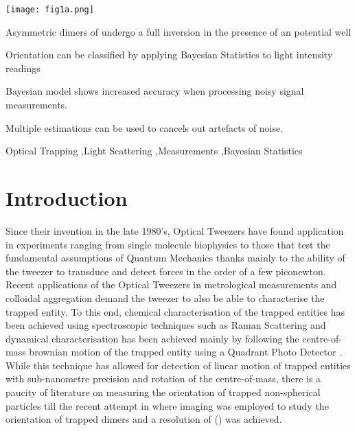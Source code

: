 \documentclass[final,3p, twocolumn]{elsarticle}
\begin{document}
\begin{frontmatter}
\begin{abstract}
\end{abstract}

\begin{graphicalabstract}
	\centering
	\texttt{[image: fig1a.png]}
\end{graphicalabstract}

\begin{highlights}
\item Asymmetric dimers of undergo a full inversion in the presence of an potential well
\item Orientation can be classified by applying Bayesian Statistics to light intensity readings
\item Bayesian model shows increased accuracy when processing noisy signal measurements. 
\item Multiple estimations can be  used to cancels out artefacts of noise. 
\end{highlights}

\begin{keyword}
	Optical Trapping \sep Light Scattering \sep Measurements \sep Bayesian Statistics

\end{keyword}

\end{frontmatter}


\section{Introduction}
\label{1}

\indent Since their invention in the late 1980's, Optical Tweezers have found application in experiments ranging from single molecule biophysics \cite{Bustamante2021Biophysics} to those that test the fundamental assumptions of Quantum Mechanics  \cite{yin2013large} thanks mainly to the ability of the tweezer to transduce and detect forces in the order of a few piconewton. Recent applications of the Optical Tweezers in metrological measurements \cite{arita2020coherent} and colloidal aggregation \cite{burns1990optical} demand the tweezer to also be able to characterise  the trapped entity. To this end, chemical characterisation of the trapped entities has been achieved using spectroscopic techniques such as Raman Scattering \cite{gupta2014raman} and dynamical characterisation has been achieved mainly by following the centre-of-mass brownian motion of the trapped entity using a Quadrant Photo Detector \cite{friedrich2012tuning}. While this technique has allowed for detection of linear motion of trapped entities  with sub-nanometre precision \cite{friedrich2012tuning} and  rotation \cite{yifat2021facile} of the centre-of-mass, there is a paucity of literature on measuring the orientation of trapped non-spherical particles till the recent attempt in \cite{raudsepp2022estimating} where imaging was employed to study the orientation of trapped dimers and a resolution of () was achieved.   
\end{document}
